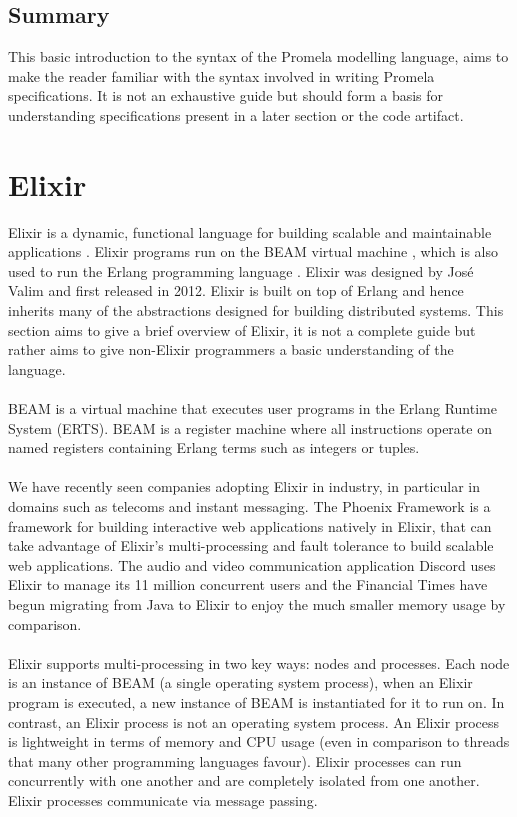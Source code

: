 \subsection{Summary}
This basic introduction to the syntax of the Promela modelling language, aims to make the reader familiar with the syntax involved in writing Promela specifications. It is not an exhaustive guide but should form a basis for understanding specifications present in a later section or the code artifact.

\section{Elixir}
Elixir is a dynamic, functional language for building scalable and maintainable applications \cite{elixir}. Elixir programs run on the BEAM virtual machine \cite{beam}, which is also used to run the Erlang programming language \cite{erlang}. Elixir was designed by José Valim and first released in 2012. Elixir is built on top of Erlang and hence inherits many of the abstractions designed for building distributed systems. This section aims to give a brief overview of Elixir, it is not a complete guide but rather aims to give non-Elixir programmers a basic understanding of the language.
\\ \\
BEAM is a virtual machine that executes user programs in the Erlang Runtime System (ERTS). BEAM is a register machine where all instructions operate on named registers containing Erlang terms such as integers or tuples.
\\ \\
We have recently seen companies adopting Elixir in industry, in particular in domains such as telecoms and instant messaging. The Phoenix Framework \cite{phoenix} is a framework for building interactive web applications natively in Elixir, that can take advantage of Elixir's multi-processing and fault tolerance to build scalable web applications. The audio and video communication application Discord \cite{discord} uses Elixir to manage its 11 million concurrent users and the Financial Times \cite{ft} have begun migrating from Java to Elixir to enjoy the much smaller memory usage by comparison.
\\ \\
Elixir supports multi-processing in two key ways: nodes and processes. Each node is an instance of BEAM (a single operating system process), when an Elixir program is executed, a new instance of BEAM is instantiated for it to run on. In contrast, an Elixir process is not an operating system process. An Elixir process is lightweight in terms of memory and CPU usage (even in comparison to threads that many other programming languages favour). Elixir processes can run concurrently with one another and are completely isolated from one another. Elixir processes communicate via message passing.

